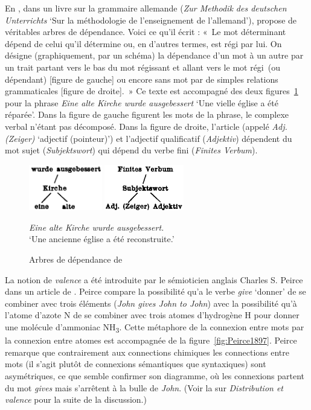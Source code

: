 {    En \citeyear{kern1883zur}, dans un livre sur la grammaire allemande (\textit{Zur Methodik des deutschen Unterrichts} ‘Sur la méthodologie de l’enseignement de l’allemand’),  propose de véritables arbres de dépendance. Voici ce qu’il écrit : «~Le mot déterminant dépend de celui qu’il détermine ou, en d’autres termes, est régi par lui. On désigne (graphiquement, par un schéma) la dépendance d’un mot à un autre par un trait partant vers le bas du mot régissant  et allant vers le mot régi~(ou dépendant) [figure de gauche] ou encore sans mot par de simples relations grammaticales [figure de droite].~» Ce texte est accompagné des deux figures~\ref{fig:Kern1883} pour la phrase \textit{Eine alte Kirche wurde ausgebessert} ‘Une vielle église a été réparée’. Dans la figure de gauche figurent les mots de la phrase, le complexe verbal n’étant pas décomposé. Dans la figure de droite, l’article (appelé \textit{Adj. (Zeiger)} ‘adjectif (pointeur)’) et l’adjectif qualificatif (\textit{Adjektiv}) dépendent du mot sujet (\textit{Subjektswort}) qui dépend du verbe fini (\textit{Finites Verbum}).

    \begin{figure}[H]
      \caption{Arbres de dépendance de \citet[10]{kern1883zur}\label{fig:Kern1883}}
    \includegraphics[height=2cm]{figures/Kern1883-1.png}
    \includegraphics[height=2cm]{figures/Kern1883-2.png}\smallskip\\    
    \noindent\parbox{6cm}{\small\textit{Eine alte Kirche wurde ausgebessert.}\\
    ‘Une ancienne église a été reconstruite.’}
    \end{figure}

    La notion de \textit{valence} a été introduite par le sémioticien anglais Charles S. Peirce dans un article de \citeyear{peirce1897logic}. Peirce compare la possibilité qu’a le verbe \textit{give} ‘donner’ de se combiner avec trois éléments (\textit{John gives John to John}) avec la possibilité qu’à l’atome d’azote N de se combiner avec trois atomes d’hydrogène H pour donner une molécule d’ammoniac NH\textsubscript{3}. Cette métaphore de la connexion entre mots par la connexion entre atomes est accompagnée de la figure~\ref{fig:Peirce1897}. Peirce remarque que contrairement aux connections chimiques les connections entre mots (il s’agit plutôt de connexions sémantiques que syntaxiques) sont asymétriques, ce que semble confirmer son diagramme, où les connexions partent du mot \textit{gives} mais s’arrêtent à la bulle de \textit{John}. (Voir la  sur \textit{Distribution et valence} pour la suite de la discussion.)

}
